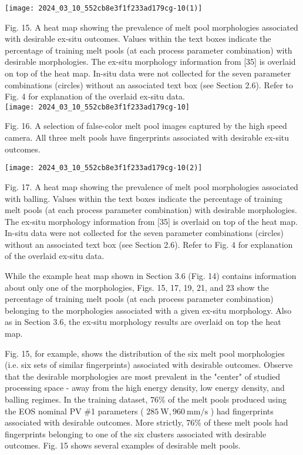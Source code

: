 \documentclass[10pt]{article}
\begin{document}
\begin{center}
\texttt{[image: 2024\_03\_10\_552cb8e3f1f233ad179cg-10(1)]}
\end{center}

Fig. 15. A heat map showing the prevalence of melt pool morphologies associated with desirable ex-situ outcomes. Values within the text boxes indicate the percentage of training melt pools (at each process parameter combination) with desirable morphologies. The ex-situ morphology information from [35] is overlaid on top of the heat map. In-situ data were not collected for the seven parameter combinations (circles) without an associated text box (see Section 2.6). Refer to Fig. 4 for explanation of the overlaid ex-situ data.\\
\texttt{[image: 2024\_03\_10\_552cb8e3f1f233ad179cg-10]}

Fig. 16. A selection of false-color melt pool images captured by the high speed camera. All three melt pools have fingerprints associated with desirable ex-situ outcomes.

\begin{center}
\texttt{[image: 2024\_03\_10\_552cb8e3f1f233ad179cg-10(2)]}
\end{center}

Fig. 17. A heat map showing the prevalence of melt pool morphologies associated with balling. Values within the text boxes indicate the percentage of training melt pools (at each process parameter combination) with desirable morphologies. The ex-situ morphology information from [35] is overlaid on top of the heat map. In-situ data were not collected for the seven parameter combinations (circles) without an associated text box (see Section 2.6). Refer to Fig. 4 for explanation of the overlaid ex-situ data.

While the example heat map shown in Section 3.6 (Fig. 14) contains information about only one of the morphologies, Figs. 15, 17, 19, 21, and 23 show the percentage of training melt pools (at each process parameter combination) belonging to the morphologies associated with a given ex-situ morphology. Also as in Section 3.6, the ex-situ morphology results are overlaid on top the heat map.

Fig. 15, for example, shows the distribution of the six melt pool morphologies (i.e. six sets of similar fingerprints) associated with desirable outcomes. Observe that the desirable morphologies are most prevalent in the "center" of studied processing space - away from the high energy density, low energy density, and balling regimes. In the training dataset, $76 \%$ of the melt pools produced using the EOS nominal PV \#1 parameters ( $285 \mathrm{~W}, 960 \mathrm{~mm} / \mathrm{s}$ ) had fingerprints associated with desirable outcomes. More strictly, $76 \%$ of these melt pools had fingerprints belonging to one of the six clusters associated with desirable outcomes. Fig. 15 shows several examples of desirable melt pools.
\end{document}
